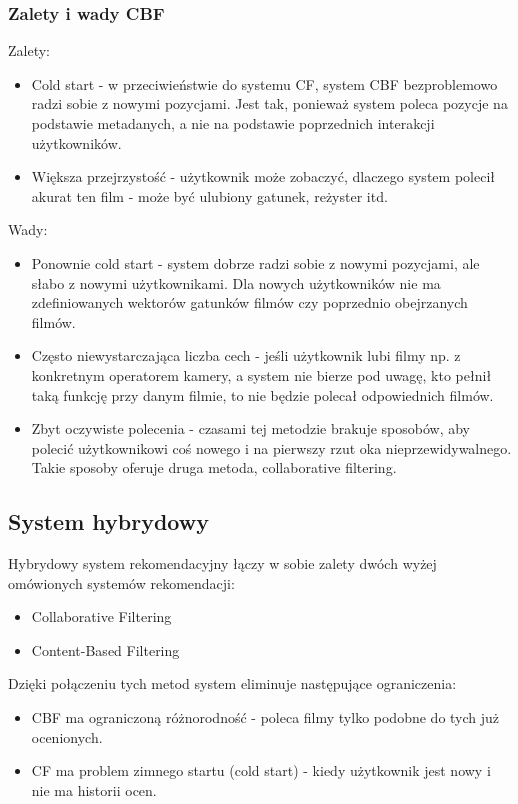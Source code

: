 \documentclass{article}
\begin{document}
\subsubsection{Zalety i wady CBF}
Zalety:
\begin{itemize}
    \item Cold start - w przeciwieństwie do systemu CF, system CBF bezproblemowo radzi sobie z nowymi pozycjami. Jest tak, ponieważ system poleca pozycje na podstawie metadanych, a nie na podstawie poprzednich interakcji użytkowników.
    \item Większa przejrzystość - użytkownik może zobaczyć, dlaczego system polecił akurat ten film - może być ulubiony gatunek, reżyster itd. 
\end{itemize}
Wady:
\begin{itemize}
    \item Ponownie cold start - system dobrze radzi sobie z nowymi pozycjami, ale słabo z nowymi użytkownikami. Dla nowych użytkowników nie ma zdefiniowanych wektorów gatunków filmów czy poprzednio obejrzanych filmów.
    \item Często niewystarczająca liczba cech - jeśli użytkownik lubi filmy np. z konkretnym operatorem kamery, a system nie bierze pod uwagę, kto pełnił taką funkcję przy danym filmie, to nie będzie polecał odpowiednich filmów.
    \item Zbyt oczywiste polecenia - czasami tej metodzie brakuje sposobów, aby polecić użytkownikowi coś nowego i na pierwszy rzut oka nieprzewidywalnego. Takie sposoby oferuje druga metoda, collaborative filtering. 
\end{itemize}

\subsection{System hybrydowy}
Hybrydowy system rekomendacyjny łączy w sobie zalety dwóch wyżej omówionych systemów rekomendacji:
\begin{itemize}
    \item Collaborative Filtering
    \item Content-Based Filtering
\end{itemize}
Dzięki połączeniu tych metod system eliminuje następujące ograniczenia:
\begin{itemize}
    \item CBF ma ograniczoną różnorodność - poleca filmy tylko podobne do tych już ocenionych.
    \item CF ma problem zimnego startu (cold start) - kiedy użytkownik jest nowy i nie ma historii ocen. 
\end{itemize}
\end{document}
